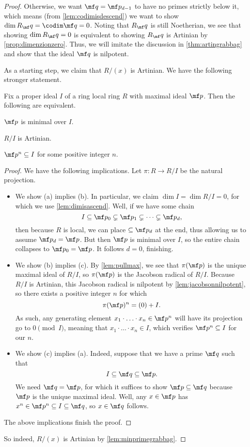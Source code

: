 \begin{proof}
	Otherwise, we want $\mf q=\mf p_{d-1}$ to have no primes strictly below it, which means (from \autoref{lem:codimisdescend}) we want to show $\dim R_\mf q=\codim\mf q=0$. Noting that $R_\mf q$ is still Noetherian, we see that showing $\dim R_\mf q=0$ is equivalent to showing $R_\mf q$ is Artinian by \autoref{prop:dimenzionzero}. Thus, we will imitate the discussion in \autoref{thm:artingrabbag} and show that the ideal $\mf q$ is nilpotent.

	As a starting step, we claim that $R/(x)$ is Artinian. We have the following stronger statement.
	\begin{lemma} \label{lem:minprimegrabbag}
		Fix a proper ideal $I$ of a ring local ring $R$ with maximal ideal $\mf p$. Then the following are equivalent.
		\begin{listalph}
			\item $\mf p$ is minimal over $I$.
			\item $R/I$ is Artinian.
			\item $\mf p^n\subseteq I$ for some positive integer $n$.
		\end{listalph}
	\end{lemma}
	\begin{proof}
		We have the following implications. Let $\pi:R\to R/I$ be the natural projection.
		\begin{itemize}
			\item We show (a) implies (b). In particular, we claim $\dim I=\dim R/I=0$, for which we use \autoref{lem:dimisascend}. Well, if we have some chain
			\[I\subseteq\mf p_0\subsetneq\mf p_1\subsetneq\cdots\subsetneq\mf p_d,\]
			then because $R$ is local, we can place $\subseteq\mf p_d$ at the end, thus allowing us to assume $\mf p_d=\mf p$. But then $\mf p$ is minimal over $I$, so the entire chain collapses to $\mf p_0=\mf p$. It follows $d=0$, finishing.
			\item We show (b) implies (c). By \autoref{lem:pullmax}, we see that $\pi(\mf p)$ is the unique maximal ideal of $R/I$, so $\pi(\mf p)$ is the Jacobson radical of $R/I$. Because $R/I$ is Artinian, this Jacobson radical is nilpotent by \autoref{lem:jacobsonnilpotent}, so there exists a positive integer $n$ for which
			\[\pi(\mf p)^n=(0)+I.\]
			As such, any generating element $x_1\cdot\ldots\cdot x_n\in\mf p^n$ will have its projection go to $0\pmod I$, meaning that $x_1\cdot\ldots\cdot x_n\in I$, which verifies $\mf p^n\subseteq I$ for our $n$.
			\item We show (c) implies (a). Indeed, suppose that we have a prime $\mf q$ such that
			\[I\subseteq\mf q\subseteq\mf p.\]
			We need $\mf q=\mf p$, for which it suffices to show $\mf p\subseteq\mf q$ because $\mf p$ is the unique maximal ideal. Well, any $x\in\mf p$ has $x^n\in\mf p^n\subseteq I\subseteq\mf q$, so $x\in\mf q$ follows.
		\end{itemize}
		The above implications finish the proof.
	\end{proof}
	So indeed, $R/(x)$ is Artinian by \autoref{lem:minprimegrabbag}.


\end{proof}
